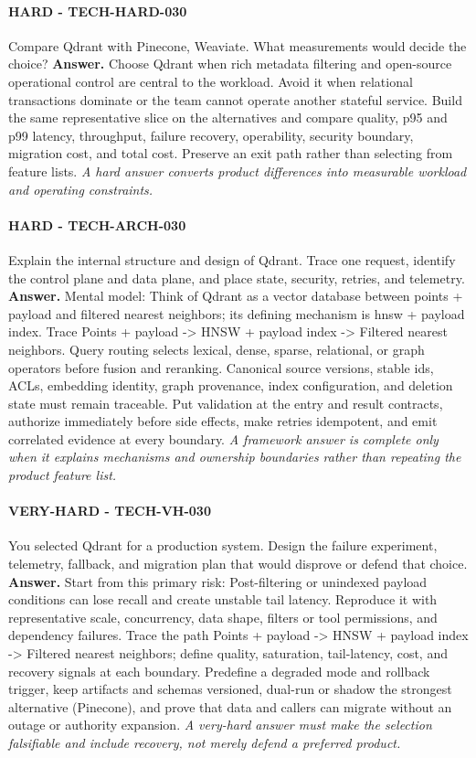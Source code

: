 \paragraph{HARD - TECH-HARD-030} Compare Qdrant with Pinecone, Weaviate. What measurements would decide the choice?
\textbf{Answer.} Choose Qdrant when rich metadata filtering and open-source operational control are central to the workload. Avoid it when relational transactions dominate or the team cannot operate another stateful service. Build the same representative slice on the alternatives and compare quality, p95 and p99 latency, throughput, failure recovery, operability, security boundary, migration cost, and total cost. Preserve an exit path rather than selecting from feature lists.
\textit{A hard answer converts product differences into measurable workload and operating constraints.}
\paragraph{HARD - TECH-ARCH-030} Explain the internal structure and design of Qdrant. Trace one request, identify the control plane and data plane, and place state, security, retries, and telemetry.
\textbf{Answer.} Mental model: Think of Qdrant as a vector database between points + payload and filtered nearest neighbors; its defining mechanism is hnsw + payload index. Trace Points + payload -> HNSW + payload index -> Filtered nearest neighbors. Query routing selects lexical, dense, sparse, relational, or graph operators before fusion and reranking. Canonical source versions, stable ids, ACLs, embedding identity, graph provenance, index configuration, and deletion state must remain traceable. Put validation at the entry and result contracts, authorize immediately before side effects, make retries idempotent, and emit correlated evidence at every boundary.
\textit{A framework answer is complete only when it explains mechanisms and ownership boundaries rather than repeating the product feature list.}
\paragraph{VERY-HARD - TECH-VH-030} You selected Qdrant for a production system. Design the failure experiment, telemetry, fallback, and migration plan that would disprove or defend that choice.
\textbf{Answer.} Start from this primary risk: Post-filtering or unindexed payload conditions can lose recall and create unstable tail latency. Reproduce it with representative scale, concurrency, data shape, filters or tool permissions, and dependency failures. Trace the path Points + payload -> HNSW + payload index -> Filtered nearest neighbors; define quality, saturation, tail-latency, cost, and recovery signals at each boundary. Predefine a degraded mode and rollback trigger, keep artifacts and schemas versioned, dual-run or shadow the strongest alternative (Pinecone), and prove that data and callers can migrate without an outage or authority expansion.
\textit{A very-hard answer must make the selection falsifiable and include recovery, not merely defend a preferred product.}
